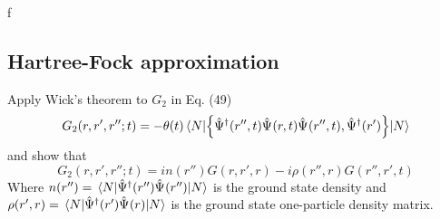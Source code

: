 \begin{solution}
f
\end{solution}

\subsection{Hartree-Fock approximation}
\begin{exercise}
Apply Wick's theorem to $G_2$ in Eq. (49)
\begin{equation}
    G_2(r,r',r'';t) = -\theta(t) \mel{N}{ \acomm{\crea{\Psi}{}(r'',t)  \anni{\Psi}{}(r,t) \anni{\Psi}{}(r'',t)}{\crea{\Psi}{}(r')}}{N}
    \label{eq:G2}
\end{equation}
and show that 
\begin{equation}
    G_2(r,r',r'';t) = i n(r'') G(r,r',r) - i \rho(r'',r) G(r'',r',t)
\end{equation}
Where $n(r'') = \mel{N}{ \hat{\Psi}_{}^{\dagger}(r'') \hat{\Psi}_{}(r'')}{N}$ is the ground state density and $\rho(r',r) = \mel{N}{ \hat{\Psi}_{}^{\dagger}(r') \hat{\Psi}_{}(r)}{N} $ is the ground state one-particle density matrix.
\end{exercise}


